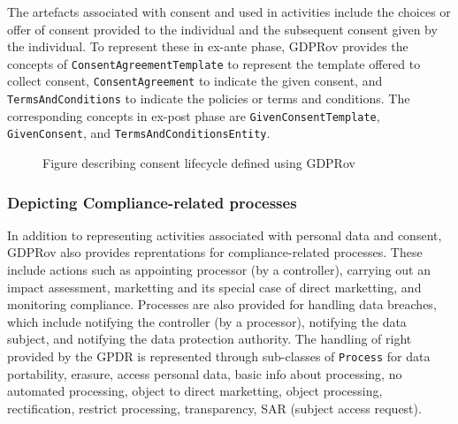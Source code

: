 The artefacts associated with consent and used in activities include the choices or offer of consent provided to the individual and the subsequent consent given by the individual.
To represent these in ex-ante phase, GDPRov provides the concepts of \texttt{ConsentAgreementTemplate} to represent the template offered to collect consent, \texttt{ConsentAgreement} to indicate the given consent, and \texttt{TermsAndConditions} to indicate the policies or terms and conditions.
The corresponding concepts in ex-post phase are \texttt{GivenConsentTemplate}, \texttt{GivenConsent}, and \texttt{TermsAndConditionsEntity}.
\begin{figure}[htbp]
    \centering
    \missingfigure[figcolor=white]{}
    \caption{Figure describing consent lifecycle defined using GDPRov}
    \label{fig:vocabs:gdprov-consent-lifecycle}
\end{figure}

\subsubsection{Depicting Compliance-related processes}
In addition to representing activities associated with personal data and consent, GDPRov also provides reprentations for compliance-related processes.
These include actions such as appointing processor (by a controller), carrying out an impact assessment, marketting and its special case of direct marketting, and monitoring compliance.
Processes are also provided for handling data breaches, which include notifying the controller (by a processor), notifying the data subject, and notifying the data protection authority.
The handling of right provided by the GPDR is represented through sub-classes of \texttt{Process} for data portability, erasure, access personal data, basic info about processing, no automated processing, object to direct marketting, object processing, rectification, restrict processing, transparency, SAR (subject access request).



